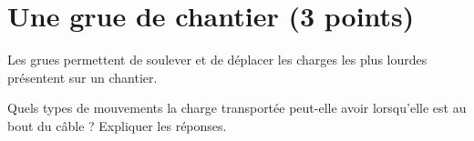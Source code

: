 \section{Une grue de chantier (3 points)}

Les grues permettent de soulever et de déplacer les charges les plus lourdes présentent sur un chantier.

\begin{questions}
	\question[3] Quels types de mouvements la charge transportée peut-elle avoir lorsqu'elle est au bout du câble ? Expliquer les réponses.
\end{questions}

\fillwithdottedlines{5cm}